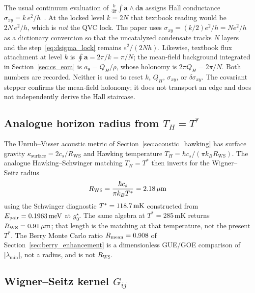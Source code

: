 \begin{remark}
\label{rem:cs_convention}
The usual continuum evaluation of $\frac{k}{4\pi}\int\mathbf{a}\wedge\mathrm{d}\mathbf{a}$ assigns Hall conductance $\sigma_{xy}=k\,e^2/h$~\cite{Laughlin1983,Wen1995}. At the locked level $k=2N$ that textbook reading would be $2N\,e^2/h$, which is \emph{not} the QVC lock. The paper uses $\sigma_{xy}=(k/2)e^2/h=N e^2/h$ as a dictionary convention so that the uncatalyzed condensate tracks $N$ layers and the step~\eqref{eq:dsigma_lock} remains $e^2/(2Nh)$. Likewise, textbook flux attachment at level $k$ is $\oint\mathbf{a}=2\pi/k=\pi/N$; the mean-field background integrated in Section~\ref{sec:cs_eom} is $a_\theta=Q_H/\rho$, whose holonomy is $2\pi Q_H=2\pi/N$. Both numbers are recorded. Neither is used to reset $k$, $Q_H$, $\sigma_{xy}$, or $\delta\sigma_{xy}$. The covariant stepper confirms the mean-field holonomy; it does not transport an edge and does not independently derive the Hall staircase.
\end{remark}

\subsection{Analogue horizon radius from \texorpdfstring{$T_H=T^*$}{TH = T*}}
\label{sec:rws_dict}

The Unruh--Visser acoustic metric of Section~\ref{sec:acoustic_hawking} has surface gravity $\kappa_{\mathrm{surface}}=2c_s/R_{\mathrm{WS}}$ and Hawking temperature $T_H=\hbar c_s/(\pi k_B R_{\mathrm{WS}})$. The analogue Hawking--Schwinger matching $T_H=T^*$ then inverts for the Wigner--Seitz radius
\begin{equation}
R_{\mathrm{WS}}=\frac{\hbar c_s}{\pi k_B T^*}=2.18\,\mu\mathrm{m}
\label{eq:Rws_match}
\end{equation}
using the Schwinger diagnostic $T^*=118.7\,\mathrm{mK}$ constructed from $E_{\mathrm{pair}}=0.1963\,\mathrm{meV}$ at $g_0^\star$. The same algebra at $T^*=285$\,mK returns $R_{\mathrm{WS}}=0.91\,\mu\mathrm{m}$; that length is the matching at that temperature, not the present $T^*$. The Berry Monte Carlo ratio $R_{\mathrm{mean}}=0.908$ of Section~\ref{sec:berry_enhancement} is a dimensionless GUE/GOE comparison of $|\lambda_{\min}|$, not a radius, and is not $R_{\mathrm{WS}}$.

\subsection{Wigner--Seitz kernel \texorpdfstring{$G_{ij}$}{G\_ij}}
\label{sec:gij_dict}


